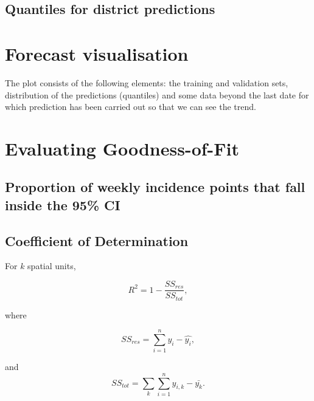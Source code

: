 \documentclass[11pt,]{article}
\begin{document}
\subsection{Quantiles for district
predictions}\label{quantiles-for-district-predictions}

\section{Forecast visualisation}\label{forecast-visualisation}

The plot consists of the following elements: the training and validation
sets, distribution of the predictions (quantiles) and some data beyond
the last date for which prediction has been carried out so that we can
see the trend.

\section{Evaluating Goodness-of-Fit}\label{evaluating-goodness-of-fit}

\subsection{Proportion of weekly incidence points that fall inside the
95\%
CI}\label{proportion-of-weekly-incidence-points-that-fall-inside-the-95-ci}

\subsection{Coefficient of
Determination}\label{coefficient-of-determination}

For \(k\) spatial units,

\[ R^2 = 1 - \frac{SS_{res}}{SS_{tot}},\]

where

\[ SS_{res} = \sum_{i = 1}^n{y_i - \hat{y_i}},\]

and \[ SS_{tot} = \sum_{k}{\sum_{i = 1}^n{y_{i, k} - \bar{y_k}}}.\]
\end{document}
